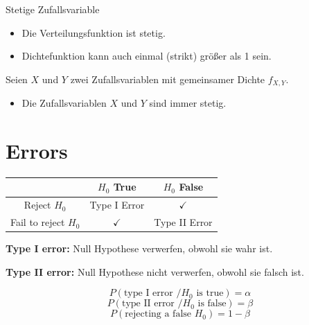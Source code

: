 \documentclass{article}
\begin{document}
Stetige Zufallsvariable
\begin{itemize}
    \item Die Verteilungsfunktion ist stetig.
    \item Dichtefunktion kann auch einmal (strikt) größer als 1 sein.
\end{itemize}

Seien $X$ und $Y$ zwei Zufallsvariablen mit gemeinsamer Dichte $f_{X, Y}$.
\begin{itemize}
    \item Die Zufallsvariablen $X$ und $Y$ sind immer stetig.
\end{itemize}

\section{Errors}

\begin{tabular}{|c|c|c|}
    \hline
    & $H_0$ True & $H_0$ False \\
    \hline
    Reject $H_0$ & Type I Error & $\checkmark$ \\
    \hline
    Fail to reject $H_0$ & $\checkmark$ & Type II Error \\
    \hline
\end{tabular}

\textbf{Type I error:} Null Hypothese verwerfen, obwohl sie wahr ist.

\textbf{Type II error:} Null Hypothese nicht verwerfen, obwohl sie falsch ist. 

$$P(\text{type I error } / H_0 \text{ is true}) = \alpha$$
$$P(\text{type II error } / H_0 \text{ is false}) = \beta$$
$$P(\text{rejecting a false } H_0) = 1 - \beta$$
\end{document}
